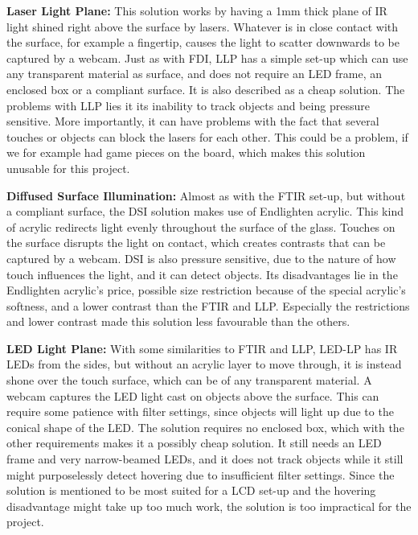 \textbf{Laser Light Plane:} This solution works by having a 1mm thick plane of IR light shined right above the surface by lasers. Whatever is in close contact with the surface, for example a fingertip, causes the light to scatter downwards to be captured by a webcam. Just as with FDI, LLP has a simple set-up which can use any transparent material as surface, and does not require an LED frame, an enclosed box or a compliant surface. It is also described as a cheap solution. The problems with LLP lies it its inability to track objects and being pressure sensitive. More importantly, it can have problems with the fact that several touches or objects can block the lasers for each other. This could be a problem, if we for example had game pieces on the board, which makes this solution unusable for this project. 
 
\textbf{Diffused Surface Illumination:} Almost as with the FTIR set-up, but without a compliant surface, the DSI solution makes use of Endlighten acrylic. This kind of acrylic redirects light evenly throughout the surface of the glass. Touches on the surface disrupts the light on contact, which creates contrasts that can be captured by a webcam. DSI is also pressure sensitive, due to the nature of how touch influences the light, and it can detect objects. Its disadvantages lie in the Endlighten acrylic's price, possible size restriction because of the special acrylic's softness, and a lower contrast than the FTIR and LLP. Especially the restrictions and lower contrast made this solution less favourable than the others.

\textbf{LED Light Plane:} With some similarities to FTIR and LLP, LED-LP has IR LEDs from the sides, but without an acrylic layer to move through, it is instead shone over the touch surface, which can be of any transparent material. A webcam captures the LED light cast on objects above the surface. This can require some patience with filter settings, since objects will light up due to the conical shape of the LED. The solution requires no enclosed box, which with the other requirements makes it a possibly cheap solution. It still needs an LED frame and very narrow-beamed LEDs, and it does not track objects while it still might purposelessly detect hovering due to insufficient filter settings. Since the solution is mentioned to be most suited for a LCD set-up and the hovering disadvantage might take up too much work, the solution is too impractical for the project.

